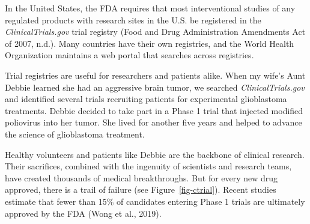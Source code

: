 \documentclass[
  letterpaper,
  DIV=11,
  numbers=noendperiod,
  oneside]{scrreprt}
\begin{document}
In the United States, the FDA requires that most interventional studies
of any regulated products with research sites in the U.S. be registered
in the \emph{ClinicalTrials.gov} trial registry (Food and Drug
Administration Amendments Act of 2007,
n.d.).
Many countries have their own registries, and the World Health
Organization maintains a web portal that searches across registries.


Trial registries are useful for researchers and patients alike. When my
wife's Aunt Debbie learned she had an aggressive brain tumor, we
searched \emph{ClinicalTrials.gov} and identified several trials
recruiting patients for experimental glioblastoma treatments. Debbie
decided to take part in a Phase 1 trial that injected modified
poliovirus into her tumor. She lived for another five years and helped
to advance the science of glioblastoma treatment.

Healthy volunteers and patients like Debbie are the backbone of clinical
research. Their sacrifices, combined with the ingenuity of scientists
and research teams, have created thousands of medical breakthroughs. But
for every new drug approved, there is a trail of failure (see
Figure~\ref{fig-ctrial}). Recent studies estimate that fewer than 15\%
of candidates entering Phase 1 trials are ultimately approved by the FDA
(Wong et al.,
2019).
\end{document}
